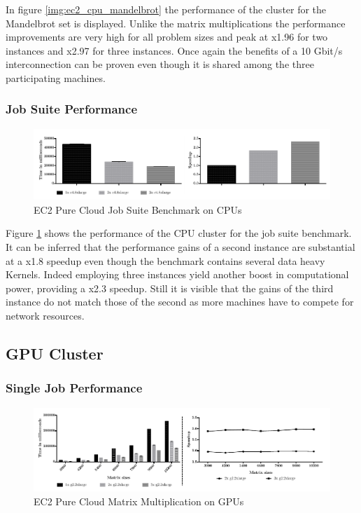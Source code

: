 In figure \ref{img:ec2_cpu_mandelbrot} the performance of the cluster for the Mandelbrot set is displayed. Unlike the matrix multiplications the performance improvements are very high for all problem sizes and peak at x1.96 for two instances and x2.97 for three instances. Once again the benefits of a 10 Gbit/s interconnection can be proven even though it is shared among the three participating machines. 
\subsubsection*{Job Suite Performance}

\begin{figure}[H]	
	\includegraphics[width=1.0\textwidth]{images/ec2_cpu_full_benchmark.pdf}
	\centering
	\caption{EC2 Pure Cloud Job Suite Benchmark on CPUs}
	\label{img:ec2_cpu_full_benchmark}
\end{figure}

Figure \ref{img:ec2_cpu_full_benchmark} shows the performance of the CPU cluster for the job suite benchmark. It can be inferred that the performance gains of a second instance are substantial at a x1.8 speedup even though the benchmark contains several data heavy Kernels. Indeed employing three instances yield another boost in computational power, providing a x2.3 speedup. Still it is visible that the gains of the third instance do not match those of the second as more machines have to compete for network resources.

\subsection{GPU Cluster}
\subsubsection*{Single Job Performance}

\begin{figure}[H]	
	\includegraphics[width=1.0\textwidth]{images/ec2_gpu_matrix_multiplication.pdf}
	\centering
	\caption{EC2 Pure Cloud Matrix Multiplication on GPUs}
	\label{img:ec2_gpu_matrix_multiplication}
\end{figure}

